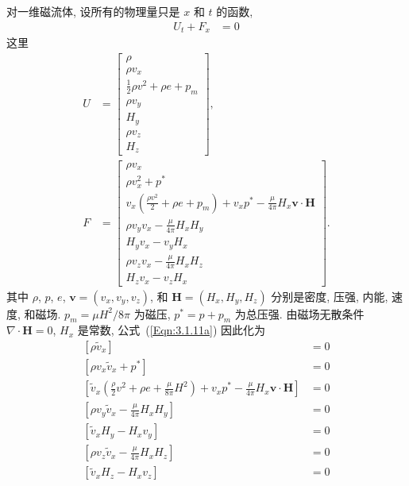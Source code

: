 \documentclass[10.5pt
]{article}
\begin{document}
对一维磁流体, 设所有的物理量只是 $x$ 和 $t$ 的函数,
\begin{align}
U_t + F_x &= 0 \label{Eqn:6.1.1}
\end{align}
这里
\begin{align}
U &= \left[\begin{array}{c}
\rho \\
\rho v_x \\
\frac{1}{2} \rho v^2 + \rho e + p_m \\
\rho v_y \\
H_y \\
\rho v_z \\
H_z
\end{array}\right], \label{Eqn:6.1.2a}
\\
F &= \left[\begin{array}{l}
\rho v_x \\
\rho v_x^2 + p^* \\
v_x \left( \frac{\rho v^2}{2} + \rho e + p_m \right) + v_x p^* - \frac{\mu}{4\pi} H_x \boldsymbol{v} \cdot \boldsymbol{H} \\
\rho v_y v_x - \frac{\mu}{4\pi} H_x H_y \\
H_y v_x - v_y H_x \\
\rho v_z v_x - \frac{\mu}{4\pi} H_x H_z \\
H_z v_x - v_z H_x
\end{array}\right]. \label{Eqn:6.1.2b}
\end{align}
其中 $\rho$, $p$, $e$, $\boldsymbol{v} = (v_x, v_y, v_z)$, 和 $\boldsymbol{H} = (H_x, H_y, H_z)$ 分别是密度, 压强, 内能, 速度, 和磁场. $p_m = \mu H^2/8\pi$ 为磁压, $p^* = p + p_m$ 为总压强. 由磁场无散条件 $\nabla \cdot \boldsymbol{H} = 0$, $H_x$ 是常数, 公式~(\ref{Eqn:3.1.11a}) 因此化为
\begin{align}
\left[ \rho \tilde v_x \right] &= 0 \label{Eqn:6.1.3}
\\
\left[ \rho v_x \tilde v_x + p^* \right] &= 0
\\
\left[\tilde v_x \left( \frac{\rho}{2} v^2 + \rho e + \frac{\mu}{8\pi} H^2 \right) +
v_x p^* -
\frac{\mu}{4\pi} H_x \boldsymbol{v} \cdot \boldsymbol{H} \right] &= 0 \label{Eqn:6.1.6}
\\
\left[ \rho v_y \tilde v_x - \frac{\mu}{4\pi} H_x H_y \right] &= 0
\\
\left[ \tilde v_x H_y - H_x v_y \right] &= 0 \label{Eqn:6.1.8}
\\
\left[ \rho v_z \tilde v_x - \frac{\mu}{4\pi} H_x H_z \right] &= 0
\\
\left[ \tilde v_x H_z - H_x v_z \right] &= 0 \label{Eqn:6.1.10}
\end{align}
\end{document}
